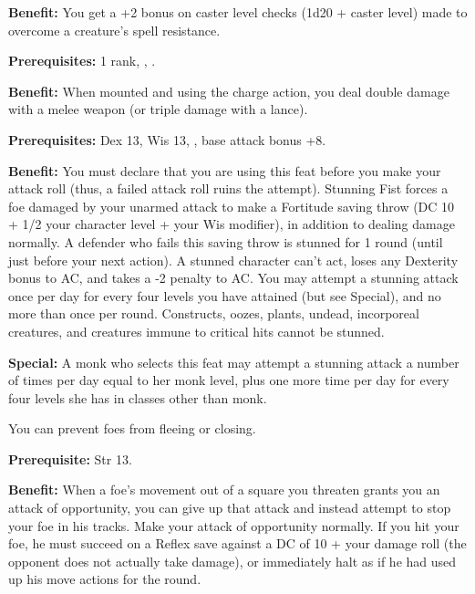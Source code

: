 
\textbf{Benefit:} You get a +2 bonus on caster level checks (1d20 + caster level) made to overcome a creature's spell resistance.


\textbf{Prerequisites:}  1 rank, , .

\textbf{Benefit:} When mounted and using the charge action, you deal double damage with a melee weapon (or triple damage with a lance).


\textbf{Prerequisites:} Dex 13, Wis 13, , base attack bonus 
+8.

\textbf{Benefit:} You must declare that you are using this feat before you make your attack roll (thus, a failed attack roll ruins the attempt). Stunning Fist forces a foe damaged by your unarmed attack to make a Fortitude saving throw (DC 10 + 1/2 your character level + your Wis modifier), in addition to dealing damage normally. A defender who fails this saving throw is stunned for 1 round (until just before your next action). A stunned character can't act, loses any Dexterity bonus to AC, and takes a -2 penalty to AC. You may attempt a stunning attack once per day for every four levels you have attained (but see Special), and no more than once per round. Constructs, oozes, plants, undead, incorporeal creatures, and creatures immune to critical hits cannot be stunned.

\textbf{Special:} A monk who selects this feat may attempt a stunning attack a number of times per day equal to her monk level, plus one more time per day for every four levels she has in classes other than monk.


You can prevent foes from fleeing or closing.

\textbf{Prerequisite:} Str 13.

\textbf{Benefit:} When a foe's movement out of a square you threaten grants you an attack of opportunity, you can give up that attack and instead attempt to stop your foe in his tracks. Make your attack of opportunity normally. If you hit your foe, he must succeed on a Reflex save against a DC of 10 + your damage roll (the opponent does not actually take damage), or immediately halt as if he had used up his move actions for the round.


